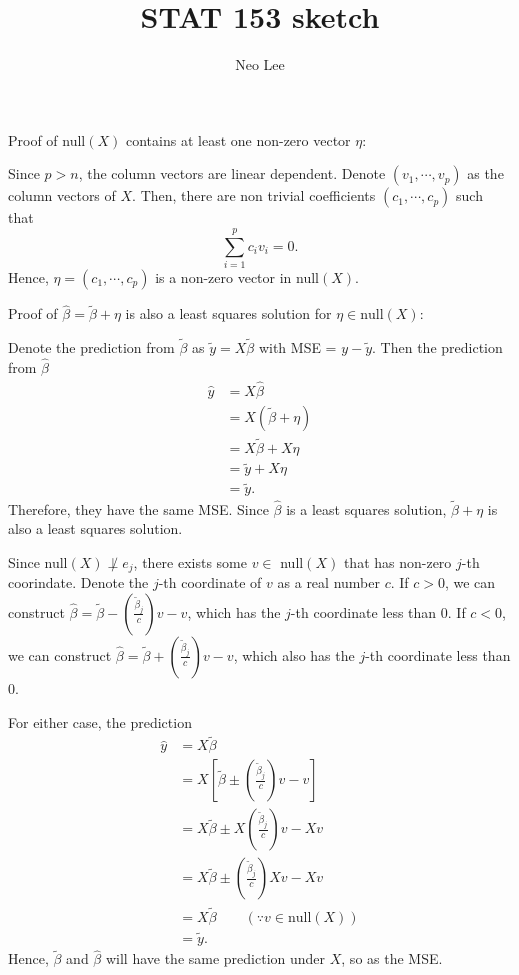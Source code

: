 \documentclass{article}
\title{STAT 153 sketch}
\author{Neo Lee}
\date{}
\begin{document}
 

\maketitle 

Proof of null$(X)$ contains at least one non-zero vector $\eta$:

Since $p>n$, the column vectors are linear dependent. Denote $(v_1, \cdots, v_p)$ as the column 
vectors of $X$. Then, there are non trivial coefficients $(c_1, \cdots, c_p)$ such that
$$\sum_{i=1}^{p}c_iv_i=0.$$
Hence, $\eta = (c_1,\cdots, c_p)$ is a non-zero vector in null$(X)$.

Proof of $\hat{\beta}=\tilde{\beta}+\eta$ is also a least squares solution for $\eta\in 
\mathrm{null}(X)$:

Denote the prediction from $\tilde{\beta}$ as $\tilde{y} = X\tilde{\beta}$ with MSE = $y-\tilde{y}$. 
Then the prediction from $\hat{\beta}$
\begin{align}
    \hat{y} & = X\hat{\beta} \\
    & = X(\tilde{\beta}+\eta) \\
    & = X\tilde{\beta}+X\eta \\
    & = \tilde{y}+X\eta \\
    & = \tilde{y}.
\end{align}
Therefore, they have the same MSE. Since $\hat{\beta}$ is a least squares solution, $\tilde{\beta}+
\eta$ is also a least squares solution.



Since null$(X)\not\perp e_j$, there exists some $v\in$ null$(X)$ that has non-zero $j$-th 
coorindate. Denote the $j$-th coordinate of $v$ as a real number $c$. If $c>0$, we can construct 
$\hat{\beta}=\tilde{\beta} - \left(\frac{\tilde{\beta}_j}{c}\right)v - v$, which has the $j$-th coordinate 
less than 0. If $c<0$, we can construct 
$\hat{\beta}=\tilde{\beta}+\left(\frac{\tilde{\beta}_j}{c}\right)v-v$, which also has the $j$-th 
coordinate less than 0.

For either case, the prediction 
\begin{align*}
    \hat{y} & = X\tilde{\beta} \\
    & = X\left[\tilde{\beta}\pm \left(\frac{\tilde{\beta}_j}{c}\right)v-v\right] \\
    & = X\tilde{\beta} \pm X\left(\frac{\tilde{\beta}_j}{c}\right)v - Xv \\
    & = X\tilde{\beta} \pm \left(\frac{\tilde{\beta}_j}{c}\right)Xv - Xv \\
    & = X\tilde{\beta} \qquad (\because v \in \mathrm{null}(X)) \\
    & = \tilde{y}.
\end{align*}
Hence, $\tilde{\beta}$ and $\hat{\beta}$ will have the same prediction under $X$, so as the MSE.
\end{document}
